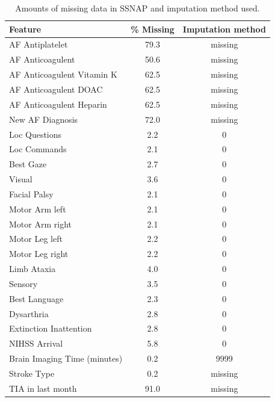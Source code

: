 \documentclass[12pt,a4paper, pdftex]{elsarticle}
\begin{document}
    \begin{table}[h!]
        \centering
        \begin{tabular}{|l|c|c|}
        \hline
        {\bf Feature} & {\bf \% Missing} & {\bf Imputation method}  \\
        \hline
        AF Antiplatelet & 79.3 & missing \\
        AF Anticoagulent & 50.6 & missing \\
        AF Anticoagulent Vitamin K & 62.5 & missing \\
        AF Anticoagulent DOAC & 62.5 &  missing \\
        AF Anticoagulent Heparin & 62.5 & missing \\
        New AF Diagnosis & 72.0 & missing \\
        Loc Questions & 2.2 &  0 \\
        Loc Commands & 2.1 & 0 \\
        Best Gaze & 2.7 & 0 \\
        Visual & 3.6 &  0 \\
        Facial Palsy & 2.1 & 0 \\
        Motor Arm left & 2.1 & 0 \\
        Motor Arm right & 2.1 & 0 \\
        Motor Leg left & 2.2 & 0 \\
        Motor Leg right & 2.2 & 0 \\
        Limb Ataxia & 4.0 & 0 \\
        Sensory & 3.5 & 0 \\
        Best Language & 2.3 & 0 \\
        Dysarthria & 2.8 & 0 \\
        Extinction Inattention & 2.8 & 0 \\
        NIHSS Arrival & 5.8 & 0 \\
        Brain Imaging Time (minutes) & 0.2 & 9999 \\
        Stroke Type & 0.2 & missing \\
        TIA in last month & 91.0 & missing \\
        
        \hline
        \end{tabular}
        \caption{Amounts of missing data in SSNAP and imputation method used.}
        \label{tab:S2}
    \end{table}
\end{document}
